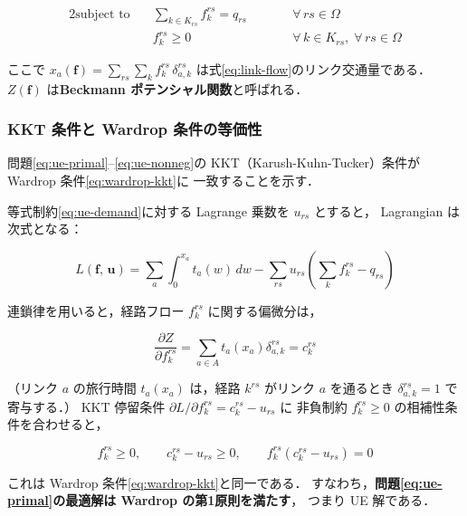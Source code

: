 \begin{alignat}{2}
  \text{subject to} \quad
  & \sum_{k \in K_{rs}} f_k^{rs} = q_{rs}
  && \qquad \forall\, rs \in \Omega
  \label{eq:ue-demand}\\
  & f_k^{rs} \geq 0
  && \qquad \forall\, k \in K_{rs},\; \forall\, rs \in \Omega
  \label{eq:ue-nonneg}
\end{alignat}

ここで $x_a(\boldsymbol{f}) = \sum_{rs}\sum_{k} f_k^{rs}\,\delta_{a,k}^{rs}$
は式\eqref{eq:link-flow}のリンク交通量である．
$Z(\boldsymbol{f})$ は\textbf{Beckmann ポテンシャル関数}と呼ばれる．

\subsubsection*{KKT 条件と Wardrop 条件の等価性}

問題\eqref{eq:ue-primal}--\eqref{eq:ue-nonneg}の
KKT（Karush-Kuhn-Tucker）条件が Wardrop 条件\eqref{eq:wardrop-kkt}に
一致することを示す\cite{Beckmann1956}．

等式制約\eqref{eq:ue-demand}に対する Lagrange 乗数を $u_{rs}$ とすると，
Lagrangian は次式となる：

\begin{equation}
  L(\boldsymbol{f},\, \boldsymbol{u})
  = \sum_{a} \int_0^{x_a} t_a(w)\, dw
  - \sum_{rs} u_{rs}\!\left(\sum_k f_k^{rs} - q_{rs}\right)
  \label{eq:lagrangian}
\end{equation}

連鎖律を用いると，経路フロー $f_k^{rs}$ に関する偏微分は，

\begin{equation}
  \frac{\partial Z}{\partial f_k^{rs}}
  = \sum_{a \in A} t_a\!\left(x_a\right) \delta_{a,k}^{rs}
  = c_k^{rs}
  \label{eq:dz-df}
\end{equation}

（リンク $a$ の旅行時間 $t_a(x_a)$ は，経路 $k^{rs}$ がリンク $a$ を通るとき
$\delta_{a,k}^{rs}=1$ で寄与する．）
KKT 停留条件 $\partial L/\partial f_k^{rs} = c_k^{rs} - u_{rs}$ に
非負制約 $f_k^{rs} \geq 0$ の相補性条件を合わせると，

\begin{equation}
  f_k^{rs} \geq 0,
  \qquad
  c_k^{rs} - u_{rs} \geq 0,
  \qquad
  f_k^{rs}(c_k^{rs} - u_{rs}) = 0
  \label{eq:kkt-ue}
\end{equation}

これは Wardrop 条件\eqref{eq:wardrop-kkt}と同一である．
すなわち，\textbf{問題\eqref{eq:ue-primal}の最適解は Wardrop の第1原則を満たす}，
つまり UE 解である．

